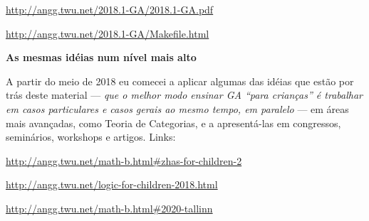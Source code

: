 \documentclass[oneside]{book}
\begin{document}
\url{http://angg.twu.net/2018.1-GA/2018.1-GA.pdf}

\url{http://angg.twu.net/2018.1-GA/Makefile.html}


\bsk
\bsk
\bsk



{\bf As mesmas idéias num nível mais alto}

A partir do meio de 2018 eu comecei a aplicar algumas das idéias que
estão por trás deste material --- {\sl que o melhor modo ensinar GA
  ``para crianças'' é trabalhar em casos particulares e casos gerais
  ao mesmo tempo, em paralelo} --- em áreas mais avançadas, como
Teoria de Categorias, e a apresentá-las em congressos, seminários,
workshops e artigos. Links:

\msk

\url{http://angg.twu.net/math-b.html\#zhas-for-children-2}

\url{http://angg.twu.net/logic-for-children-2018.html}

\url{http://angg.twu.net/math-b.html\#2020-tallinn}




% 
% 
% 
% 
% 
\end{document}

